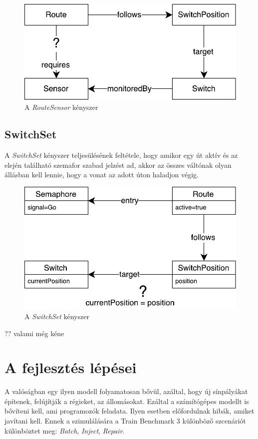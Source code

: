 \begin{figure}[!ht]
	\centering
	\includegraphics[width=0.7\linewidth, keepaspectratio]{figures/RouteSensor.pdf}
	\caption{A \emph{RouteSensor} kényszer}
	\label{fig:RouteSensor}
\end{figure}

\subsection{SwitchSet}

A \emph{SwitchSet} kényszer teljesülésének feltétele, hogy amikor egy út aktív és az elején található szemafor szabad jelzést ad, akkor az összes váltónak olyan állásban kell lennie, hogy a vonat az adott úton haladjon végig.

\begin{figure}[!ht]
	\centering
	\includegraphics[width=0.7\linewidth, keepaspectratio]{figures/SwitchSet.pdf}
	\caption{A \emph{SwitchSet} kényszer}
	\label{fig:SwitchSet}
\end{figure}

?? valami még kéne

\section{A fejlesztés lépései}

A valóságban egy ilyen modell folyamatosan bővül, azáltal, hogy új sínpályákat építenek, felújítják a régieket, az állomásokat. Ezáltal a számítógépes modellt is bővíteni kell, ami programozók feladata. Ilyen esetben előfordulnak hibák, amiket javítani kell. Ennek a szimulálására a Train Benchmark 3 különböző szcenáriót különböztet meg: \emph{Batch}, \emph{Inject}, \emph{Repair}.

